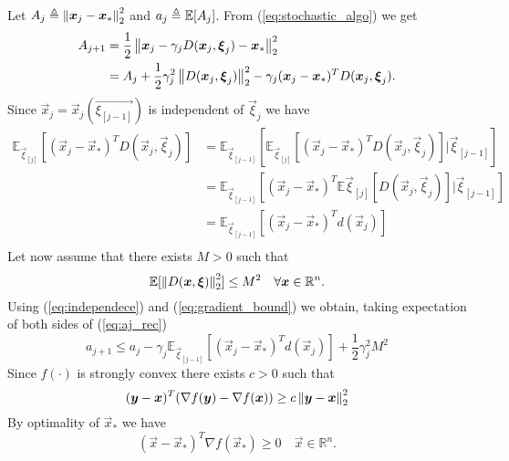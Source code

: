 Let $A_j\triangleq \left\Vert \boldsymbol{x}_j-\boldsymbol{x}_* \right\Vert^2_2$ and $a_j\triangleq\mathbb{E}[A_j]$.
From (\ref*{eq:stochastic_algo}) we get
\begin{equation}
\begin{aligned}
A_{j+1} &= \frac{1}{2}\left\Vert \boldsymbol{x}_j - \gamma_jD(\boldsymbol{x}_j,\boldsymbol{\xi}_j) -\boldsymbol{x}_* \right\Vert^2_2\\ 
&= A_j +\frac{1}{2}\gamma_j^2\left\Vert D(\boldsymbol{x}_j,\boldsymbol{\xi}_j) \right\Vert^2_2 - \gamma_j(\boldsymbol{x}_j-\boldsymbol{x}_*)^TD(\boldsymbol{x}_j,\boldsymbol{\xi}_j).
\end{aligned}
\label{eq:aj_rec}
\end{equation}
Since $\vec{x}_j = \vec{x}_j(\vec{\xi_{[j-1]}})$ is independent of $\vec{\xi}_j$ we have
\begin{equation}
\begin{aligned}
\mathbb{E}_{\vec{\xi}_{[j]}}[(\vec{x}_j-\vec{x}_*)^TD(\vec{x}_j,\vec{\xi}_j)] &= \mathbb{E}_{\vec{\xi}_{[j-1]}}[\mathbb{E}_{\vec{\xi}_{[j]}}[(\vec{x}_j-\vec{x}_*)^TD(\vec{x}_j,\vec{\xi}_j)]|\vec{\xi}_{[j-1]}]\\
&= \mathbb{E}_{\vec{\xi}_{[j-1]}}[(\vec{x}_j-\vec{x}_*)^T\mathbb{E}{\vec{\xi}_{[j]}}[D(\vec{x}_j,\vec{\xi}_j)]|\vec{\xi}_{[j-1]}]\\
&=\mathbb{E}_{\vec{\xi}_{[j-1]}}[(\vec{x}_j-\vec{x}_*)^Td(\vec{x}_j)]\\
\end{aligned}
\label{eq:independece}
\end{equation}
Let now assume that there exists $M>0$ such that
\begin{equation}
\mathbb{E}[\left\Vert D(\boldsymbol{x},\boldsymbol{\xi}) \right\Vert^2_2]\leq M^2 \quad \forall \boldsymbol{x} \in \mathbb{R}^n.
\label{eq:gradient_bound}
\end{equation}
Using (\ref{eq:independece}) and (\ref{eq:gradient_bound}) we obtain, taking expectation of both sides of (\ref{eq:aj_rec})
\begin{equation}
a_{j+1} \leq a_j - \gamma_j\mathbb{E}_{\vec{\xi}_{[j-1]}}[(\vec{x}_j-\vec{x}_*)^Td(\vec{x}_j)] + \frac{1}{2}\gamma_j^2M^2
\label{eq:aj_rec_2}
\end{equation}
Since $f(\cdot)$ is strongly convex there exists $c>0$ such that
\begin{equation}
(\boldsymbol{y}-\boldsymbol{x})^T(\nabla f(\boldsymbol{y})- \nabla f(\boldsymbol{x}))\geq c \left\Vert \boldsymbol{y}-\boldsymbol{x} \right\Vert^2_2
\label{eq:strong_convexity}
\end{equation}
By optimality of $\vec{x}_*$ we have
\begin{equation}
(\vec{x}-\vec{x}_*)^T\nabla f(\vec{x}_*) \geq 0 \quad \vec{x} \in \mathbb{R}^n.
\label{eq:optimality}
\end{equation}
